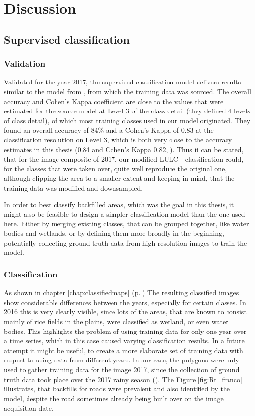 \documentclass[11pt, A4, oneside]{report}
\begin{document}
\newpage
\chapter{Discussion}
\section{Supervised classification}

\subsection{Validation}
Validated for the year 2017, the supervised classification model delivers results similar to the model from \citet{Dupuy.2020a}, from which the training data was sourced. The overall accuracy and Cohen's Kappa coefficient are close to the values that were estimated for the source model at Level 3 of the class detail (they defined 4 levels of class detail), of which most training classes used in our model originated. They found an overall accuracy of 84\% and a Cohen's Kappa of 0.83 at the classification resolution on Level 3, which is both very close to the accuracy estimates in this thesis (0.84 and Cohen's Kappa 0.82, \cite{Dupuy.2020a}). Thus it can be stated, that for the image composite of 2017, our modified LULC - classification could, for the classes that were taken over, quite well reproduce the original one, although clipping the area to a smaller extent and keeping in mind, that the training data was modified and downsampled. 

In order to best classify backfilled areas, which was the goal in this thesis, it might also be feasible to design a simpler classification model than the one used here. Either by merging existing classes, that can be grouped together, like water bodies and wetlands, or by defining them more broadly in the beginning, potentially collecting ground truth data from high resolution images to train the model.

\subsection{Classification}
As shown in chapter \ref{chap:classifiedmaps} (p. \pageref{chap:classifiedmaps}) The resulting classified images show considerable differences between the years, especially for certain classes. In 2016 this is very clearly visible, since lots of the areas, that are known to consist mainly of rice fields in the plains, were classified as wetland, or even water bodies. This highlights the problem of using training data for only one year over a time series, which in this case caused varying classification results. In a future attempt it might be useful, to create a more elaborate set of training data with respect to using data from different years. In our case, the polygons were only used to gather training data for the image 2017, since the collection of ground truth data took place over the 2017 rainy season (\cite{Dupuy.2020a, Dupuy.2020b}). The Figure \ref{fig:Rt_franco} illustrates, that backfills for roads were prevalent and also identified by the model, despite the road sometimes already being built over on the image acquisition date.
\end{document}
